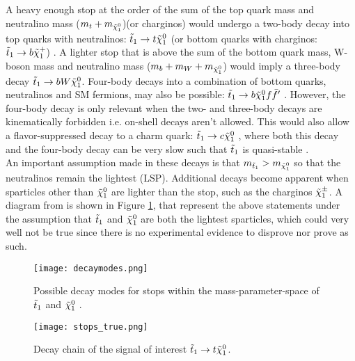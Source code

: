 A heavy enough stop at the order of the sum of the top quark mass and neutralino mass ($m_t+m_{\Tilde{\chi}_1^0}$)(or charginos) would undergo a two-body decay into top quarks with neutralinos: $\Tilde{t}_1\rightarrow t\Tilde{\chi}_1^0$ (or bottom quarks with charginos: $\Tilde{t}_1\rightarrow b\Tilde{\chi}_1^+$) \cite{boehm2000decays}. A lighter stop that is above the sum of the bottom quark mass, W-boson mass and neutralino mass ($m_b + m_W + m_{\Tilde{\chi}_1^0}$) would imply a three-body decay $\Tilde{t}_1\rightarrow b W \Tilde{\chi}_1^0$. Four-body decays into a combination of bottom quarks, neutralinos and SM fermions, may also be possible: $\Tilde{t}_1\rightarrow b\Tilde{\chi}_1^0 f \Bar{f}'$ \cite{boehm2000decays}. However, the four-body decay is only relevant when the two- and three-body decays are kinematically forbidden i.e. on-shell decays aren't allowed. This would also allow a flavor-suppressed decay to a charm quark: $\Tilde{t}_1\rightarrow c\Tilde{\chi}_1^0$ \cite{aad2014search}, where both this decay and the four-body decay can be very slow such that $\Tilde{t}_1$ is quasi-stable \cite{martin1997supersymmetry}. \\

An important assumption made in these decays is that $m_{\Tilde{t}_1} > m_{\Tilde{\chi}_1^0} $ so that the neutralinos remain the lightest (LSP). Additional decays become apparent when sparticles other than $\Tilde{\chi}_1^0 $ are lighter than the stop, such as the charginos $\Tilde{\chi}_1^{\pm}$.
A diagram from \cite{aad2014search} is shown in Figure \ref{fig:decayMode}, that represent the above statements under the assumption that $\Tilde{t}_1 $ and $ \Tilde{\chi}_1^0 $ are both the lightest sparticles, which could very well not be true since there is no experimental evidence to disprove nor prove as such. \\


\begin{figure}[htbp]
    \centering
    \texttt{[image: decaymodes.png]}
    \caption{Possible decay modes for stops within the mass-parameter-space of $\Tilde{t}_1 $ and $ \Tilde{\chi}_1^0 $ \cite{aad2014search}.}
    \label{fig:decayMode}
\end{figure}

\begin{figure}[htbp]
    \centering
    \texttt{[image: stops\_true.png]}
    \caption{Decay chain of the signal of interest $\Tilde{t}_1 \rightarrow t\Tilde{\chi}_1^0 $.}
    \label{fig:decayInterest}
\end{figure}

